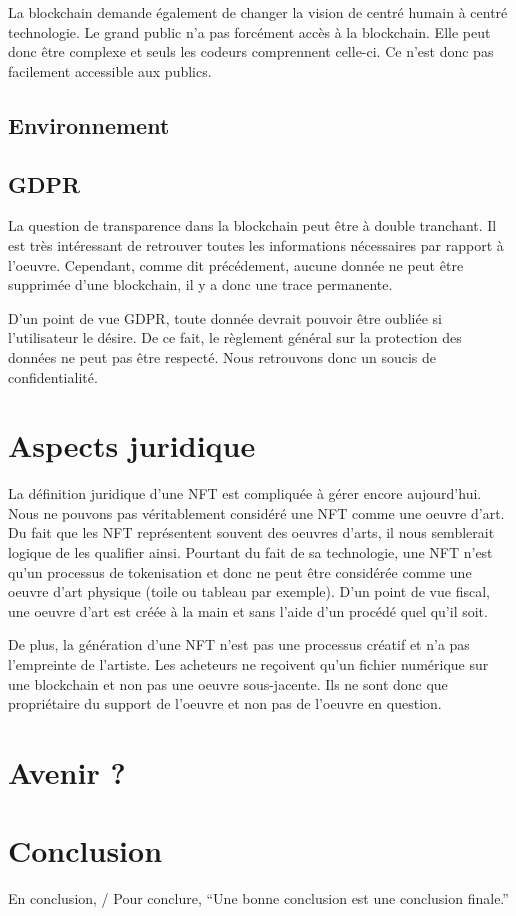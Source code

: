 \documentclass[11pt]{article}
\begin{document}
La blockchain demande également de changer la vision de centré humain à centré technologie. Le grand public n'a pas forcément accès à la blockchain. Elle peut donc être complexe et seuls les codeurs comprennent celle-ci. Ce n'est donc pas facilement accessible aux publics. 
\subsection{Environnement} %

\subsection{GDPR} %
La question de transparence dans la blockchain peut être à double tranchant. Il est très intéressant de retrouver toutes les informations nécessaires par rapport à l'oeuvre. Cependant, comme dit précédement, aucune donnée ne peut être supprimée d'une blockchain, il y a donc une trace permanente. 

D'un point de vue GDPR, toute donnée devrait pouvoir être oubliée si l'utilisateur le désire. De ce fait, le règlement général sur la protection des données ne peut pas être respecté. Nous retrouvons donc un soucis de confidentialité.
\section{Aspects juridique} %
La définition juridique d'une NFT est compliquée à gérer encore aujourd'hui. Nous ne pouvons pas véritablement considéré une NFT comme une oeuvre d'art.  Du fait que les NFT représentent souvent des oeuvres d'arts, il nous semblerait logique de les qualifier ainsi. Pourtant du fait de sa technologie, une NFT n'est qu'un processus de tokenisation et donc ne peut être considérée comme une oeuvre d'art physique (toile ou tableau par exemple). D'un point de vue fiscal, une oeuvre d'art est créée à la main et sans l'aide d'un procédé quel qu'il soit. 

De plus, la génération d'une NFT n'est pas une processus créatif et n'a pas l'empreinte de l'artiste. Les acheteurs ne reçoivent qu'un fichier numérique sur une blockchain et non pas une oeuvre sous-jacente. Ils ne sont donc que propriétaire du support de l'oeuvre et non pas de l'oeuvre en question.  \cite{meghraoui_les_2022}

\section{Avenir ?} %

\section{Conclusion} %
En conclusion, / Pour conclure, 
\enquote{Une bonne conclusion est une conclusion finale.}

\break
\printbibliography[
heading=bibintoc,
title={Bibliographie}
]
\end{document}
